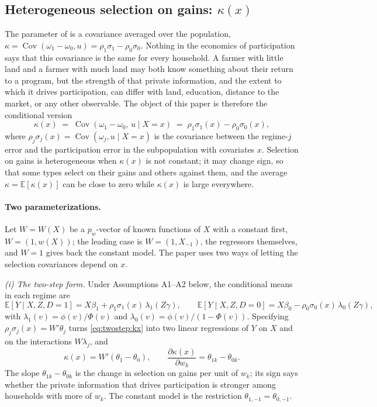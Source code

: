 \documentclass[11pt,a4paper]{article}
\theoremstyle{plain}
\theoremstyle{definition}
\theoremstyle{remark}
\newcommand{\E}{\mathbb{E}}
\newcommand{\Cov}{\operatorname{Cov}}
\newcommand{\1}{\mathbf{1}}
\newcommand{\kX}{\kappa(x)}
\begin{document}
\subsection{Heterogeneous selection on gains: \texorpdfstring{$\kX$}{kappa(x)}}\label{sec:model:kx}

The parameter of \citet{araar2026sog} is a covariance averaged over the
population, $\kappa=\Cov(\omega_1-\omega_0,u)=\rho_1\sigma_1-\rho_0\sigma_0$.
Nothing in the economics of participation says that this covariance is the
same for every household. A farmer with little land and a farmer with much
land may both know something about their return to a program, but the
strength of that private information, and the extent to which it drives
participation, can differ with land, education, distance to the market, or
any other observable. The object of this paper is therefore the conditional
version
\begin{equation}\label{eq:kx}
\kX \;=\; \Cov(\omega_1-\omega_0,\,u\mid X=x)\;=\;\rho_1\sigma_1(x)-\rho_0\sigma_0(x),
\end{equation}
where $\rho_j\sigma_j(x)=\Cov(\omega_j,u\mid X=x)$ is the covariance between
the regime-$j$ error and the participation error in the subpopulation with
covariates $x$. Selection on gains is heterogeneous when $\kX$ is not
constant; it may change sign, so that some types select on their gains and
others against them, and the average $\kappa=\E[\kX]$ can be close to zero
while $\kX$ is large everywhere.

\paragraph{Two parameterizations.}
Let $W=W(X)$ be a $p_w$-vector of known functions of $X$ with a constant
first, $W=(1,w(X))$; the leading case is $W=(1,X_{-1})$, the regressors
themselves, and $W=1$ gives back the constant model. The paper uses two
ways of letting the selection covariances depend on $x$.

\emph{(i) The two-step form.} Under Assumptions A1--A2 below, the
conditional means in each regime are
\begin{equation}\label{eq:twostep:kx}
\E[Y\mid X,Z,D=1]=X\beta_1+\rho_1\sigma_1(x)\,\lambda_1(Z\gamma),\qquad
\E[Y\mid X,Z,D=0]=X\beta_0-\rho_0\sigma_0(x)\,\lambda_0(Z\gamma),
\end{equation}
with $\lambda_1(v)=\phi(v)/\Phi(v)$ and $\lambda_0(v)=\phi(v)/(1-\Phi(v))$.
Specifying $\rho_j\sigma_j(x)=W'\theta_j$ turns \eqref{eq:twostep:kx} into
two linear regressions of $Y$ on $X$ and on the interactions $W\lambda_j$,
and
\begin{equation}\label{eq:kx:lin}
\kX=W'(\theta_1-\theta_0),\qquad \frac{\partial\kX}{\partial w_k}=\theta_{1k}-\theta_{0k}.
\end{equation}
The slope $\theta_{1k}-\theta_{0k}$ is the change in selection on gains per
unit of $w_k$; its sign says whether the private information that drives
participation is stronger among households with more of $w_k$. The
constant model is the restriction $\theta_{1,-1}=\theta_{0,-1}$.
\end{document}
